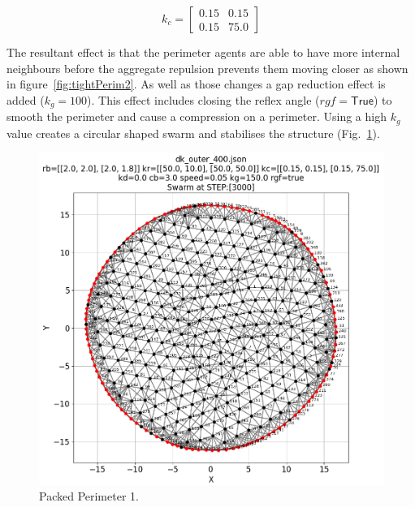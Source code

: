\documentclass[12pt,a4paper]{IEEEtran}
\newcommand{\kc}{\mathit{k_{c}}}
\newcommand{\kg}{\mathit{k_{g}}}
\newcommand{\rgf}{\mathit{rgf}}
\begin{document}
\begin{equation}\label{eq:kcexp1}
\kc = 
\begin{bmatrix}
0.15 & 0.15\\
0.15 & 75.0
\end{bmatrix}
\end{equation}

The resultant effect is that the perimeter agents are able to have more internal neighbours before the aggregate repulsion prevents them moving closer as shown in figure~\ref{fig:tightPerim2}. As well as those changes a gap reduction effect is added ($\kg=100$). This effect includes closing the reflex angle ($\rgf=\mathsf{True}$) to smooth the perimeter and cause a  compression on a perimeter. Using a high $\kg$ value creates a circular shaped swarm and stabilises the structure (Fig.~\ref{fig:tightPerim}).

\begin{figure}[H]
	\begin{center}
		\includegraphics[width=1.0\linewidth]{figures/outer1}
	\end{center}
	\caption{Packed Perimeter 1. \label{fig:tightPerim}}
\end{figure}
\end{document}
